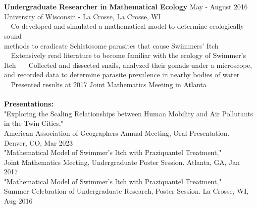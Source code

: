 \documentclass[letterpaper,12pt]{article}
\numberwithin{equation}{section}
\begin{document}
\\\\
\hspace*{1.16in} \textbf{Undergraduate Researcher in Mathematical Ecology} \hspace*{.56in} May - August 2016\\
\hspace*{1.16in} University of Wisconsin - La Crosse, La Crosse, WI \vspace*{.1cm}\\
\hspace*{1.2in} \textbullet ~~Co-developed and simulated a mathematical model to determine ecologically-sound \\\hspace*{1.6in} methods to eradicate Schistosome parasites that cause Swimmers' Itch \\
\hspace*{1.2in} \textbullet ~~Extensively read literature to become familiar with the ecology of Swimmer's Itch
\hspace*{1.2in} \textbullet ~~~Collected and dissected snails, analyzed their gonads under a microscope, \\
\hspace*{1.6in} and recorded data to determine parasite prevalence in nearby bodies of water\\
\hspace*{1.2in} \textbullet ~~Presented results at 2017 Joint Mathematics Meeting in Atlanta
\\\\
\noindent\textbf{Presentations:}
\vspace*{.3cm} \\
"Exploring the Scaling Relationships between Human Mobility and Air Pollutants in the Twin Cities,"
\\ \indent American Association of Geographers Annual Meeting, Oral Presentation. Denver, CO, Mar 2023
\vspace*{.1cm} \\
"Mathematical Model of Swimmer's Itch with Praziquantel Treatment," 
\\ \indent Joint Mathematics Meeting, Undergraduate Poster Session. Atlanta, GA, Jan 2017
\vspace*{.1cm} \\
"Mathematical Model of Swimmer's Itch with Praziquantel Treatment,"
\\ \indent Summer Celebration of Undergraduate Research, Poster Session. La Crosse, WI, Aug 2016
\\\\
\end{document}
